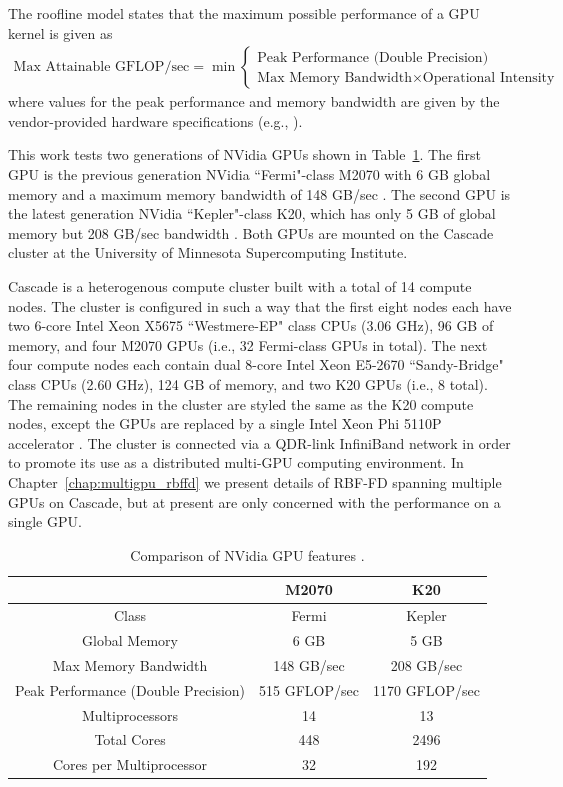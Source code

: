 \documentclass{report}
\begin{document}
The roofline model states that the maximum possible performance of a GPU kernel is given as
\begin{align}
\text{Max Attainable GFLOP/sec} = \min \begin{cases} \text{Peak Performance (Double Precision)} \\ \text{Max Memory Bandwidth} \times \text{Operational Intensity}  \end{cases}
\label{eq:roofline}
\end{align}
where values for the peak performance and memory bandwidth are given by the vendor-provided hardware specifications (e.g., \cite{M2070FactSheet, KeplerFactSheet}). 

This work tests two generations of NVidia GPUs shown in Table~\ref{tbl:gpu_comparison}. The first GPU is the previous generation NVidia ``Fermi"-class M2070 with 6 GB global memory and a maximum memory bandwidth of 148 GB/sec \cite{M2070FactSheet}. The second GPU is the latest generation NVidia ``Kepler"-class K20, which has only 5 GB of global memory but 208 GB/sec bandwidth \cite{KeplerFactSheet}. Both GPUs are mounted on the Cascade cluster at the University of Minnesota Supercomputing Institute. 

Cascade is a heterogenous compute cluster built with a total of 14 compute nodes. The cluster is configured in such a way that the first eight nodes each have two 6-core Intel Xeon X5675 ``Westmere-EP" class CPUs (3.06 GHz), 96 GB of memory, and four M2070 GPUs (i.e., 32 Fermi-class GPUs in total). The next four compute nodes each contain dual 8-core Intel Xeon E5-2670 ``Sandy-Bridge" class CPUs (2.60 GHz), 124 GB of memory, and two K20 GPUs (i.e., 8 total). The remaining nodes in the cluster are styled the same as the K20 compute nodes, except the GPUs are replaced by a single Intel Xeon Phi 5110P accelerator \cite{IntelXeonPhi2013}. The cluster is connected via a QDR-link InfiniBand network in order to promote its use as a distributed multi-GPU computing environment. In Chapter~\ref{chap:multigpu_rbffd} we present details of RBF-FD spanning multiple GPUs on Cascade, but at present are only concerned with the performance on a single GPU. 

\begin{table}[t]
\centering
\caption{Comparison of NVidia GPU features \cite{M2070FactSheet,KeplerFactSheet}.}
\label{tbl:gpu_comparison}
\begin{tabular}{c|c|c}
 & M2070  & K20 \\ \hline
Class & Fermi & Kepler \\ \hline
Global Memory & 6 GB & 5 GB \\ 
Max Memory Bandwidth & 148 GB/sec & 208 GB/sec \\ 
Peak Performance (Double Precision) & 515 GFLOP/sec & 1170 GFLOP/sec \\ 
Multiprocessors & 14 & 13 \\ 
Total Cores & 448 & 2496 \\ 
Cores per Multiprocessor & 32 & 192 \\ \hline
\end{tabular}
\end{table}
\end{document}
